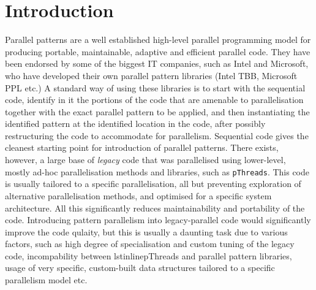 \section{Introduction}
Parallel patterns are a well established high-level parallel programming model for producing portable, maintainable, adaptive and efficient parallel code. They have been endorsed by some of the biggest IT companies, such as Intel and Microsoft, who have developed their own parallel pattern libraries (Intel TBB, Microsoft PPL etc.) A standard way of using these libraries is to start with the sequential code, identify in it the portions of the code that are amenable to parallelisation together with the exact parallel pattern to be applied, and then instantiating the identified pattern at the identified location in the code, after possibly restructuring the code to accommodate for parallelism. Sequential code gives the cleanest starting point for introduction of parallel patterns. There exists, however, a large base of \emph{legacy} code that was parallelised using lower-level, mostly ad-hoc parallelisation methods and libraries, such as \lstinline{pThreads}. This code is usually tailored to a specific parallelisation, all but preventing exploration of alternative parallelisation methods, and optimised for a specific system architecture. All this significantly reduces maintainability and portability of the code. %
Introducing pattern parallelism into legacy-parallel code would significantly improve the code qulaity, but this is usually a daunting task due to various factors, such as high degree of specialisation and custom tuning of the legacy code, incompability between lstinline{pThreads} and parallel pattern libraries, usage of very specific, custom-built data structures tailored to a specific parallelism model etc.
  
